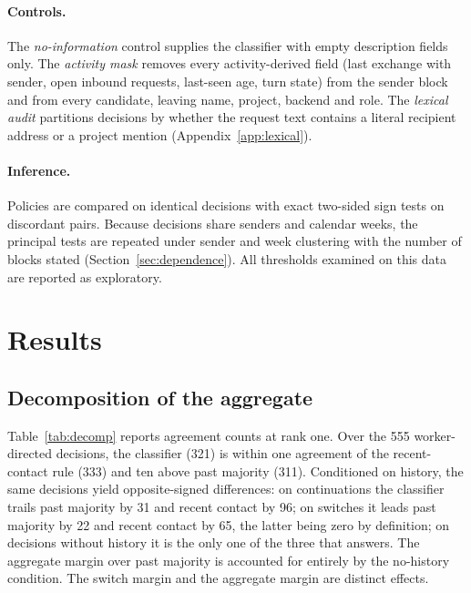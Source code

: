 \documentclass[11pt]{article}
\theoremstyle{definition}
\begin{document}
\paragraph{Controls.}
The \emph{no-information} control supplies the classifier with empty description fields only. The \emph{activity mask} removes every activity-derived field (last exchange with sender, open inbound requests, last-seen age, turn state) from the sender block and from every candidate, leaving name, project, backend and role. The \emph{lexical audit} partitions decisions by whether the request text contains a literal recipient address or a project mention (Appendix~\ref{app:lexical}).

\paragraph{Inference.}
Policies are compared on identical decisions with exact two-sided sign tests on discordant pairs. Because decisions share senders and calendar weeks, the principal tests are repeated under sender and week clustering with the number of blocks stated (Section~\ref{sec:dependence}). All thresholds examined on this data are reported as exploratory.

\section{Results}

\subsection{Decomposition of the aggregate}
\label{sec:decomp}

Table~\ref{tab:decomp} reports agreement counts at rank one. Over the 555 worker-directed decisions, the classifier (321) is within one agreement of the recent-contact rule (333) and ten above past majority (311). Conditioned on history, the same decisions yield opposite-signed differences: on continuations the classifier trails past majority by 31 and recent contact by 96; on switches it leads past majority by 22 and recent contact by 65, the latter being zero by definition; on decisions without history it is the only one of the three that answers. The aggregate margin over past majority is accounted for entirely by the no-history condition. The switch margin and the aggregate margin are distinct effects.
\end{document}
